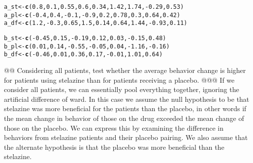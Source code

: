 \documentclass[10pt]{article}\usepackage[]{graphicx}\usepackage[]{xcolor}
\makeatletter
\newcommand{\hlnum}[1]{\textcolor[rgb]{0.686,0.059,0.569}{#1} }%
\newcommand{\hlopt}[1]{\textcolor[rgb]{0,0,0}{#1} }%
\newcommand{\hlstd}[1]{\textcolor[rgb]{0.345,0.345,0.345}{#1} }%
\newcommand{\hlkwb}[1]{\textcolor[rgb]{0.69,0.353,0.396}{#1} }%
\newcommand{\hlkwd}[1]{\textcolor[rgb]{0.737,0.353,0.396}{\textbf{#1} } }%
\newenvironment{kframe}{%
 \def\at@end@of@kframe{}%
 \ifinner\ifhmode%
  \def\at@end@of@kframe{\end{minipage} }%
  \begin{minipage}{\columnwidth}%
 \fi\fi%
 \def\FrameCommand##1{\hskip\@totalleftmargin \hskip-\fboxsep
 \colorbox{shadecolor}{##1}\hskip-\fboxsep
     \hskip-\linewidth \hskip-\@totalleftmargin \hskip\columnwidth}%
 \MakeFramed {\advance\hsize-\width
   \@totalleftmargin\z@ \linewidth\hsize
   \@setminipage} }%
 {\par\unskip\endMakeFramed%
 \at@end@of@kframe}
\newenvironment{knitrout}{}{} %
\makeatother
\begin{document}
\begin{easylist}[enumerate]
\begin{knitrout}
\color{fgcolor}\begin{kframe}
\begin{alltt}
     \hlstd{a_st} \hlkwb{<-} \hlkwd{c}\hlstd{(}\hlnum{0.8}\hlstd{,} \hlnum{0.1}\hlstd{,} \hlnum{0.55}\hlstd{,} \hlnum{0.6}\hlstd{,} \hlnum{0.34}\hlstd{,} \hlnum{1.42}\hlstd{,} \hlnum{1.74}\hlstd{,} \hlopt{-}\hlnum{0.29}\hlstd{,} \hlnum{0.53}\hlstd{)}
     \hlstd{a_pl} \hlkwb{<-} \hlkwd{c}\hlstd{(}\hlopt{-}\hlnum{0.4}\hlstd{,} \hlnum{0.4}\hlstd{,} \hlopt{-}\hlnum{0.1}\hlstd{,} \hlopt{-}\hlnum{0.9}\hlstd{,} \hlnum{0.2}\hlstd{,} \hlnum{0.78}\hlstd{,} \hlnum{0.3}\hlstd{,} \hlnum{0.64}\hlstd{,} \hlnum{0.42}\hlstd{)}
     \hlstd{a_df} \hlkwb{<-} \hlkwd{c}\hlstd{(}\hlnum{1.2}\hlstd{,} \hlopt{-}\hlnum{0.3}\hlstd{,} \hlnum{0.65}\hlstd{,} \hlnum{1.5}\hlstd{,} \hlnum{0.14}\hlstd{,} \hlnum{0.64}\hlstd{,} \hlnum{1.44}\hlstd{,} \hlopt{-}\hlnum{0.93}\hlstd{,} \hlnum{0.11}\hlstd{)}

     \hlstd{b_st} \hlkwb{<-} \hlkwd{c}\hlstd{(}\hlopt{-}\hlnum{0.45}\hlstd{,} \hlnum{0.15}\hlstd{,} \hlopt{-}\hlnum{0.19}\hlstd{,} \hlnum{0.12}\hlstd{,} \hlnum{0.03}\hlstd{,} \hlopt{-}\hlnum{0.15}\hlstd{,} \hlnum{0.48}\hlstd{)}
     \hlstd{b_pl} \hlkwb{<-} \hlkwd{c}\hlstd{(}\hlnum{0.01}\hlstd{,} \hlnum{0.14}\hlstd{,} \hlopt{-}\hlnum{0.55}\hlstd{,} \hlopt{-}\hlnum{0.05}\hlstd{,} \hlnum{0.04}\hlstd{,} \hlopt{-}\hlnum{1.16}\hlstd{,} \hlopt{-}\hlnum{0.16}\hlstd{)}
     \hlstd{b_df} \hlkwb{<-} \hlkwd{c}\hlstd{(}\hlopt{-}\hlnum{0.46}\hlstd{,} \hlnum{0.01}\hlstd{,} \hlnum{0.36}\hlstd{,} \hlnum{0.17}\hlstd{,} \hlopt{-}\hlnum{0.01}\hlstd{,} \hlnum{1.01}\hlstd{,} \hlnum{0.64}\hlstd{)}
\end{alltt}
\end{kframe}
\end{knitrout}



    @@ Considering all patients, test whether the average behavior change is higher for patients using stelazine than
    for patients receiving a placebo.
    @@@ If we consider all patients, we can essentially pool everything together, ignoring the artificial difference of
    ward. In this case we assume the null hypothesis to be that stelazine was more beneficial for the patients than the
    placebo, in other words if the mean change in behavior of those on the drug exceeded the mean change of those on the
    placebo. We can express this by examining the difference in behaviors from stelazine patients and their placebo
    pairing. We also assume that the alternate hypothesis is that the placebo was more beneficial than the stelazine.


\end{easylist}
\end{document}
